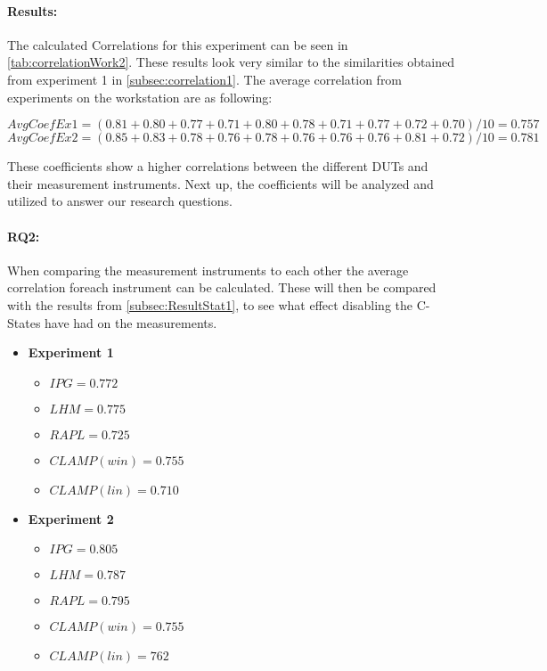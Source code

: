 \paragraph{Results:} The calculated Correlations for this experiment can be seen in \cref{tab:correlationWork2}. These results look very similar to the similarities obtained from experiment 1 in \cref{subsec:correlation1}. The average correlation from experiments on the workstation are as following:

$$AvgCoefEx1 = (0.81+0.80+0.77+0.71+0.80+0.78+0.71+0.77+0.72+0.70)/10 = 0.757$$
$$AvgCoefEx2 = (0.85+0.83+0.78+0.76+0.78+0.76+0.76+0.76+0.81+0.72)/10 = 0.781$$

These coefficients show a higher correlations between the different DUTs and their measurement instruments. Next up, the coefficients will be analyzed and utilized to answer our research questions. 

\paragraph{RQ2:} When comparing the measurement instruments to each other the average correlation foreach instrument can be calculated. These will then be compared with the results from \cref{subsec:ResultStat1}, to see what effect disabling the C-States have had on the measurements.

\begin{itemize}
    \item \textbf{Experiment 1}
    \begin{itemize}
        \item $IPG = 0.772$ %
        \item $LHM = 0.775$ %
        \item $RAPL = 0.725$ %
        \item $CLAMP(win) = 0.755$ %
        \item $CLAMP(lin) = 0.710$ %
    \end{itemize}
    \item \textbf{Experiment 2}
    \begin{itemize}
        \item $IPG = 0.805$ %
        \item $LHM = 0.787$ %
        \item $RAPL = 0.795$%
        \item $CLAMP(win) = 0.755$ %
        \item $CLAMP(lin) = 762$ %
    \end{itemize}
\end{itemize}

